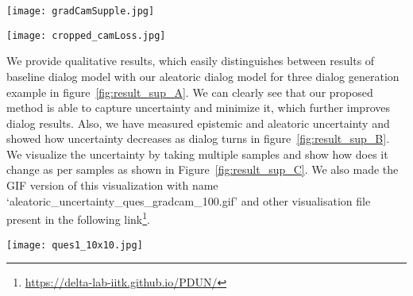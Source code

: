 \documentclass[review]{elsarticle}
\begin{document}
\begin{figure*}[ht]
	\centering
\texttt{[image: gradCamSupple.jpg]}
	\vspace{-3em}
	\caption{Difference Between Aleatoric dialog results and Baseline dialog results are shown in the figure. In this figure,The first row refer to  Grad-CAM visualization of first example for  baseline visual dialog model  and second row refer to Grad-CAM visualization of first example for aleatoric visual dialog model and so on.. The first column indicates target Image and corresponding caption, second column indicates visualization of dialog round 1, third column refer to visualization of dialog round 2 and so on.}
	\label{fig:result_sup_A}
\end{figure*}

\begin{figure*}[ht]
	\centering
	\texttt{[image: cropped\_camLoss.jpg]}
	\vspace{-3em}
	\caption{ This figure provide aleatoric  and epidemic variance and visualize the aleatoric uncertainty using Grad-CAM for a particular Dialog. }
	\label{fig:result_sup_B}
\end{figure*}




We provide qualitative results, which easily distinguishes between results of baseline dialog model with our aleatoric dialog model for three dialog generation example in figure~\ref{fig:result_sup_A}. We can clearly see that our proposed method is able to capture uncertainty and minimize it, which further improves dialog results. Also, we have measured epistemic and aleatoric uncertainty and showed how uncertainty decreases as dialog turns in figure~\ref{fig:result_sup_B}. We visualize the uncertainty by taking multiple samples and show how does it change as per samples as shown in Figure~\ref{fig:result_sup_C}. We also made the GIF version of this visualization with name `aleatoric\_uncertainty\_ques\_gradcam\_100.gif' and other visualisation file present in the following link\footnote{\url{https://delta-lab-iitk.github.io/PDUN/}}.

\begin{figure*}[!htb]
	\vspace{-6em}
	\centering
	\texttt{[image: ques1\_10x10.jpg]} \vspace{-6em}
	\caption{We visualize the multiple outputs from the Bayesian neural network. We took 100 sample from the posterior distribution of dialog model for particular image, particular question. It shows how Grad-CAM is flowing for particular image, particular question.}
	\label{fig:result_sup_C}
\end{figure*}
\end{document}
